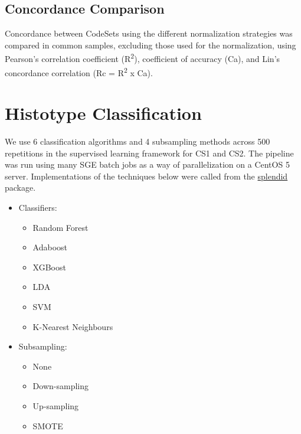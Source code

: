 \documentclass[
]{report}
\providecommand{\tightlist}{%
  \setlength{\itemsep}{0pt}\setlength{\parskip}{0pt}}
\begin{document}
\hypertarget{concordance-comparison}{%
\subsection{Concordance Comparison}\label{concordance-comparison}}

Concordance between CodeSets using the different normalization strategies was compared in common samples, excluding those used for the normalization, using Pearson's correlation coefficient (R\textsuperscript{2}), coefficient of accuracy (Ca), and Lin's concordance correlation (Rc = R\textsuperscript{2} x Ca).

\hypertarget{histotype-classification}{%
\section{Histotype Classification}\label{histotype-classification}}

We use 6 classification algorithms and 4 subsampling methods across 500 repetitions in the supervised learning framework for CS1 and CS2. The pipeline was run using many SGE batch jobs as a way of parallelization on a CentOS 5 server. Implementations of the techniques below were called from the \href{https://alinetalhouk.github.io/splendid/}{splendid} package.

\begin{itemize}
\item
  Classifiers:

  \begin{itemize}
  \tightlist
  \item
    Random Forest
  \item
    Adaboost
  \item
    XGBoost
  \item
    LDA
  \item
    SVM
  \item
    K-Nearest Neighbours
  \end{itemize}
\item
  Subsampling:

  \begin{itemize}
  \tightlist
  \item
    None
  \item
    Down-sampling
  \item
    Up-sampling
  \item
    SMOTE
  \end{itemize}
\end{itemize}
\end{document}
